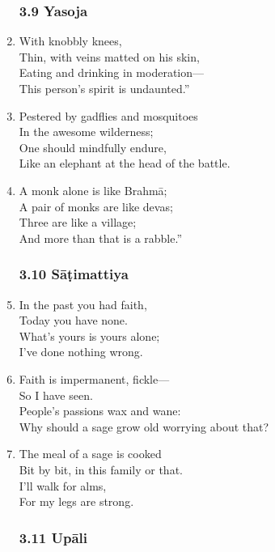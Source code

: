 \documentclass[10pt, openany]{book}
\newcommand*{\vleftofline}[1]{\leavevmode\llap{#1}}
\begin{document}
\begin{enumerate}
\subsubsection*{3.9 Yasoja}

\item \vleftofline{“}With knobbly knees,\\
Thin, with veins matted on his skin,\\
Eating and drinking in moderation—\\
This person’s spirit is undaunted.”

\item \vleftofline{“}Pestered by gadflies and mosquitoes\\
In the awesome wilderness;\\
One should mindfully endure,\\
Like an elephant at the head of the battle.

\item A monk alone is like Brahmā;\\
A pair of monks are like devas;\\
Three are like a village;\\
And more than that is a rabble.”

\subsubsection*{3.10 Sāṭimattiya}

\item In the past you had faith,\\
Today you have none.\\
What’s yours is yours alone;\\
I’ve done nothing wrong.

\item Faith is impermanent, fickle—\\
So I have seen.\\
People’s passions wax and wane:\\
Why should a sage grow old worrying about that?

\item The meal of a sage is cooked\\
Bit by bit, in this family or that.\\
I’ll walk for alms,\\
For my legs are strong.

\subsubsection*{3.11 Upāli}


\end{enumerate}
\end{document}
